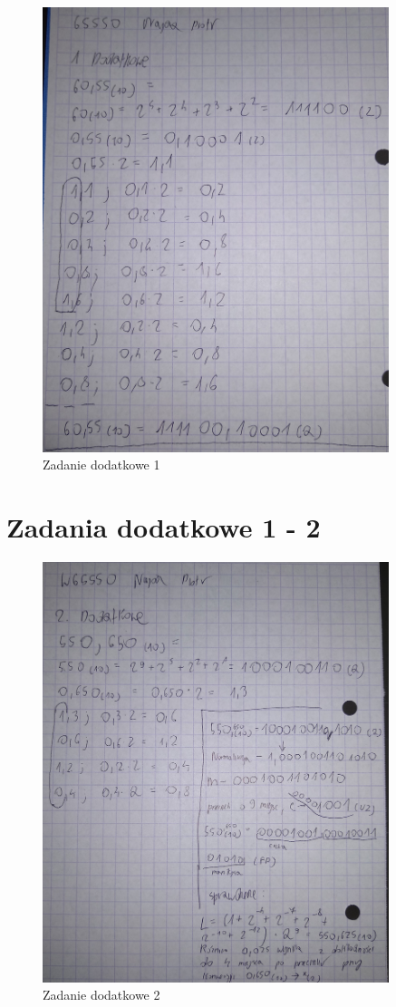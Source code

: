\documentclass[12pt,a4paper]{article}
\begin{document}
\begin{figure}[ht]
\centering
\includegraphics[width=0.9\textwidth]{IMG_20211102_174500~2.jpg}
\caption{\label{fig:zaddod1}Zadanie dodatkowe 1}
\end{figure}

\section{Zadania dodatkowe 1 - 2}

\begin{figure}[ht]
\centering
\includegraphics[width=0.9\textwidth]{IMG_20211102_174542~2.jpg}
\caption{\label{fig:zaddod2}Zadanie dodatkowe 2}
\end{figure}
\end{document}
